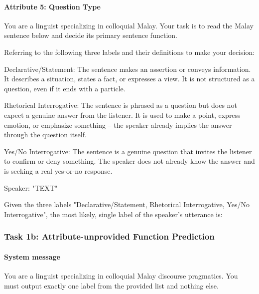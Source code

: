\documentclass[11pt]{article}
\begin{document}
\paragraph{Attribute 5: Question Type}
\begin{PromptBlock}
You are a linguist specializing in colloquial Malay. Your task is to read the Malay sentence below and decide its primary sentence function.

Referring to the following three labels and their definitions to make your decision:

Declarative/Statement: The sentence makes an assertion or conveys information. It describes a situation, states a fact, or expresses a view. It is not structured as a question, even if it ends with a particle.

Rhetorical Interrogative: The sentence is phrased as a question but does not expect a genuine answer from the listener. It is used to make a point, express emotion, or emphasize something -- the speaker already implies the answer through the question itself.

Yes/No Interrogative: The sentence is a genuine question that invites the listener to confirm or deny something. The speaker does not already know the answer and is seeking a real yes-or-no response.

Speaker: "{TEXT}"

Given the three labels "Declarative/Statement, Rhetorical Interrogative, Yes/No Interrogative", the most likely, single label of the speaker's utterance is:
\end{PromptBlock}

\subsubsection{Task 1b: Attribute-unprovided Function Prediction}

\paragraph{System message}
\begin{PromptBlock}
You are a linguist specializing in colloquial Malay discourse pragmatics. You must output exactly one label from the provided list and nothing else.
\end{PromptBlock}
\end{document}
